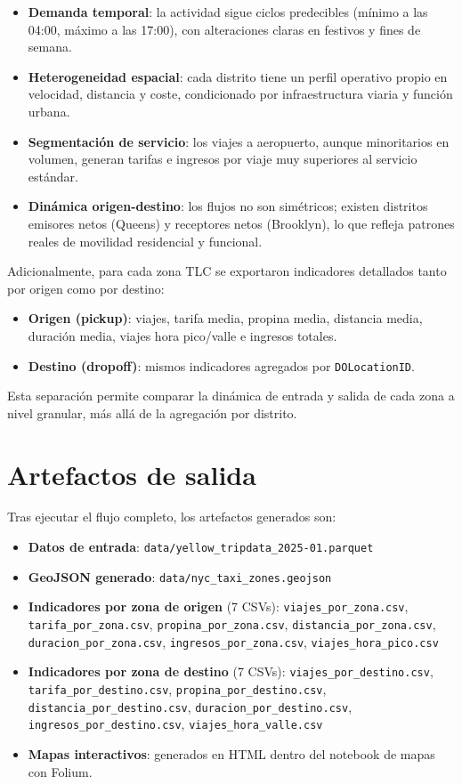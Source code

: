 \begin{itemize}
	\item \textbf{Demanda temporal}: la actividad sigue ciclos predecibles
	(mínimo a las 04:00, máximo a las 17:00), con alteraciones claras en
	festivos y fines de semana.
	\item \textbf{Heterogeneidad espacial}: cada distrito tiene un perfil
	operativo propio en velocidad, distancia y coste, condicionado por
	infraestructura viaria y función urbana.
	\item \textbf{Segmentación de servicio}: los viajes a aeropuerto,
	aunque minoritarios en volumen, generan tarifas e ingresos por viaje
	muy superiores al servicio estándar.
	\item \textbf{Dinámica origen-destino}: los flujos no son simétricos;
	existen distritos emisores netos (Queens) y receptores netos
	(Brooklyn), lo que refleja patrones reales de movilidad residencial y
	funcional.
\end{itemize}

Adicionalmente, para cada zona TLC se exportaron indicadores detallados tanto
por origen como por destino:
\begin{itemize}
	\item \textbf{Origen (pickup)}: viajes, tarifa media, propina media,
	distancia media, duración media, viajes hora pico/valle e ingresos totales.
	\item \textbf{Destino (dropoff)}: mismos indicadores agregados por
	\texttt{DOLocationID}.
\end{itemize}

Esta separación permite comparar la dinámica de entrada y salida de cada zona
a nivel granular, más allá de la agregación por distrito.

\section{Artefactos de salida}
Tras ejecutar el flujo completo, los artefactos generados son:

\begin{itemize}
	\item \textbf{Datos de entrada}: \texttt{data/yellow\_tripdata\_2025-01.parquet}
	\item \textbf{GeoJSON generado}: \texttt{data/nyc\_taxi\_zones.geojson}
	\item \textbf{Indicadores por zona de origen} (7 CSVs):
	\texttt{viajes\_por\_zona.csv}, \texttt{tarifa\_por\_zona.csv},
	\texttt{propina\_por\_zona.csv}, \texttt{distancia\_por\_zona.csv},
	\texttt{duracion\_por\_zona.csv}, \texttt{ingresos\_por\_zona.csv},
	\texttt{viajes\_hora\_pico.csv}
	\item \textbf{Indicadores por zona de destino} (7 CSVs):
	\texttt{viajes\_por\_destino.csv}, \texttt{tarifa\_por\_destino.csv},
	\texttt{propina\_por\_destino.csv}, \texttt{distancia\_por\_destino.csv},
	\texttt{duracion\_por\_destino.csv}, \texttt{ingresos\_por\_destino.csv},
	\texttt{viajes\_hora\_valle.csv}
	\item \textbf{Mapas interactivos}: generados en HTML dentro del notebook
	de mapas con Folium.
\end{itemize}

